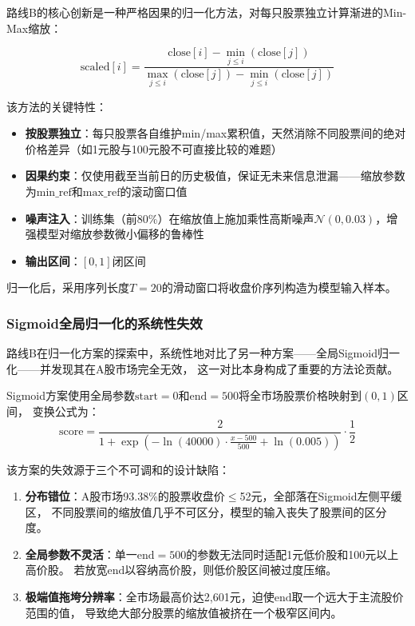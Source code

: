 \documentclass[12pt,a4paper]{ctexart}
\begin{document}
路线B的核心创新是一种严格因果的归一化方法，对每只股票独立计算渐进的Min-Max缩放：

\begin{equation}
\text{scaled}[i] = \frac{\text{close}[i] - \min_{j \le i}(\text{close}[j])}
                         {\max_{j \le i}(\text{close}[j]) - \min_{j \le i}(\text{close}[j])}
\end{equation}

该方法的关键特性：
\begin{itemize}[leftmargin=*]
    \item \textbf{按股票独立}：每只股票各自维护min/max累积值，天然消除不同股票间的绝对价格差异（如1元股与100元股不可直接比较的难题）
    \item \textbf{因果约束}：仅使用截至当前日的历史极值，保证无未来信息泄漏——缩放参数为$\text{min\_ref}$和$\text{max\_ref}$的滚动窗口值
    \item \textbf{噪声注入}：训练集（前80\%）在缩放值上施加乘性高斯噪声$\mathcal{N}(0, 0.03)$，增强模型对缩放参数微小偏移的鲁棒性
    \item \textbf{输出区间}：$[0, 1]$闭区间
\end{itemize}

归一化后，采用序列长度$T=20$的滑动窗口将收盘价序列构造为模型输入样本。

\subsubsection{Sigmoid全局归一化的系统性失效}

路线B在归一化方案的探索中，系统性地对比了另一种方案——全局Sigmoid归一化——并发现其在A股市场完全无效，
这一对比本身构成了重要的方法论贡献。

Sigmoid方案使用全局参数$\text{start}=0$和$\text{end}=500$将全市场股票价格映射到$(0,1)$区间，
变换公式为：
\begin{equation}
\text{score} = \frac{2}{1 + \exp\left(-\ln(40000) \cdot \frac{x-500}{500} + \ln(0.005)\right)} \cdot \frac{1}{2}
\end{equation}

该方案的失效源于三个不可调和的设计缺陷：

\begin{enumerate}[leftmargin=*]
    \item \textbf{分布错位}：A股市场93.38\%的股票收盘价$\le$52元，全部落在Sigmoid左侧平缓区，
          不同股票间的缩放值几乎不可区分，模型的输入丧失了股票间的区分度。
    \item \textbf{全局参数不灵活}：单一$\text{end}=500$的参数无法同时适配1元低价股和100元以上高价股。
          若放宽$\text{end}$以容纳高价股，则低价股区间被过度压缩。
    \item \textbf{极端值拖垮分辨率}：全市场最高价达2,601元，迫使$\text{end}$取一个远大于主流股价范围的值，
          导致绝大部分股票的缩放值被挤在一个极窄区间内。
\end{enumerate}
\end{document}
